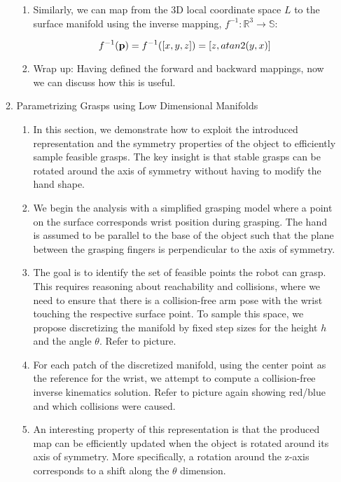 \documentclass{aamas2015}
\begin{document}
\begin{enumerate}
\begin{enumerate}
\begin{enumerate}
		\item Similarly, we can map from the 3D local coordinate space $L$ to the 
		surface manifold using the inverse mapping, $f^{-1}: \mathbb{R}^3 \rightarrow \mathbb{S}$:
		
		\begin{equation}
			f^{-1}(\textbf{p}) = f^{-1}([x,y,z]) = [z, atan2(y,x)]
		\end{equation}
		
		\item Wrap up: Having defined the forward and backward mappings, now we can discuss how this is useful.
	\end{enumerate}
	
	\item Parametrizing Grasps using Low Dimensional Manifolds
	\begin{enumerate}
		
		\item In this section, we demonstrate how to exploit the introduced representation and the symmetry properties of the object to efficiently sample feasible grasps. The key insight is that stable grasps can be rotated around the axis of symmetry without having to modify the hand shape. 
			
		\item We begin the analysis with a simplified grasping model where a point
		on the surface corresponds wrist position during grasping. The hand is assumed to be parallel to the base of the object such that the plane between the grasping fingers is perpendicular to the axis of symmetry. 

		\item The goal is to identify the set of feasible points the robot can grasp. This requires reasoning about reachability and collisions, where we need to ensure that there is a collision-free arm pose with the wrist touching the respective surface point. To sample this space, we propose discretizing the manifold by fixed step sizes for the height $h$ and the angle $\theta$. Refer to picture.
		
		\item For each patch of the discretized manifold, using the center point 
		as the reference for the wrist, we attempt to compute a collision-free 		inverse kinematics solution. Refer to picture again showing red/blue and which collisions were caused. 
		
		\item An interesting property of this representation is that the produced map can be efficiently updated when the object is rotated around its axis of symmetry. More specifically, a rotation around the z-axis corresponds to a shift along the $\theta$ dimension. 
		

\end{enumerate}
\end{enumerate}
\end{enumerate}
\end{document}
